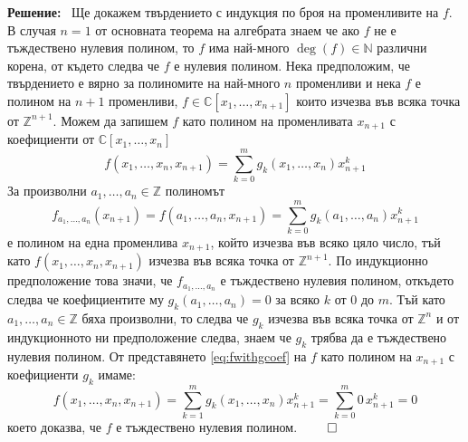 \documentclass[a4paper,12pt,fleqn]{article}
\newcommand\solution{%
  \textbf{Решение:}~%
}
\begin{document}
    \solution{Ще докажем твърдението с индукция по броя на променливите на \( f \). В случая \( n = 1 \) от основната теорема на алгебрата знаем че ако \( f \) не е тъждествено нулевия полином, то \( f \) има най-много \( \deg(f) \in \mathbb{N} \) различни корена, от където следва че \( f \) е нулевия полином. Нека предположим, че твърдението е вярно за полиномите на най-много \( n \) променливи и нека \( f \) е полином на \( n + 1 \) променливи, \( f \in \mathbb{C}\left[ x_{1},\dots,x_{n+1} \right] \) които изчезва във всяка точка от \( \mathbb{Z}^{n+1} \). Можем да запишем \( f \) като полином на променливата \( x_{n+1} \) с коефициенти от \( \mathbb{C}\left[ x_{1},\dots,x_{n} \right] \) 
    \begin{equation}\label{eq:fwithgcoef}
        f\left( x_{1},\dots,x_{n},x_{n+1} \right) = \sum_{k=0}^{m}g_{k}\left( x_{1},\dots,x_{n} \right)x_{n+1}^{k}
    \end{equation}
    За произволни \( a_{1},\dots,a_{n} \in \mathbb{Z} \) полиномът
    \begin{equation*}
        f_{a_{1},\dots,a_{n}}\left( x_{n+1} \right) = f\left( a_{1},\dots,a_{n},x_{n+1} \right) = \sum_{k=0}^{m}g_{k}\left( a_{1},\dots,a_{n} \right)x_{n+1}^{k}
    \end{equation*}
    е полином на една променлива \( x_{n+1} \), който изчезва във всяко цяло число, тъй като \( f\left( x_{1},\dots,x_{n},x_{n+1} \right) \) изчезва във всяка точка от \( \mathbb{Z}^{n+1} \). По индукционно предположение това значи, че \( f_{a_{1},\dots,a_{n}} \) е тъждествено нулевия полином, откъдето следва че коефициентите му \( g_{k}\left( a_{1},\dots,a_{n} \right) = 0\) за всяко \( k \) от \( 0 \) до \( m \). Тъй като \( a_{1},\dots,a_{n} \in \mathbb{Z}\) бяха произволни, то следва че \( g_{k} \) изчезва във всяка точка от \( \mathbb{Z}^{n} \) и от индукционното ни предположение следва, знаем че \( g_{k} \) трябва да е тъждествено нулевия полином. От представянето \eqref{eq:fwithgcoef} на \( f \) като полином на \( x_{n+1} \) с коефициенти \( g_{k} \) имаме: 
    \begin{equation*}
        f\left( x_{1},\dots,x_{n},x_{n+1} \right) = \sum_{k=1}^{m}g_{k}\left( x_{1},\dots,x_{n} \right)x_{n+1}^{k} = \sum_{k=0}^{m}0\,x_{n+1}^{k}=0
    \end{equation*}
    което доказва, че \( f \) е тъждествено нулевия полином. \hfill \( \qed\)
    }
\end{document}
